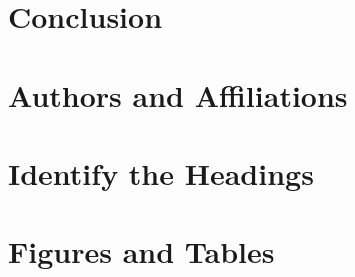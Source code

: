 \documentclass[conference]{IEEEtran}
\begin{document}
\section{Conclusion}


\section{Authors and Affiliations}


\section{Identify the Headings}


\section{Figures and Tables}





\end{document}
